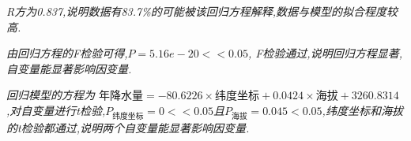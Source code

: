 \documentclass[
]{article}
\begin{document}
\emph{R方为0.837,说明数据有83.7\%的可能被该回归方程解释,数据与模型的拟合程度较高.}

\emph{由回归方程的F检验可得,\(P = 5.16e-20 << 0.05\),
F检验通过,说明回归方程显著,自变量能显著影响因变量.}

\emph{回归模型的方程为
\(\text{年降水量} = -80.6226 \times \text{纬度坐标} + 0.0424 \times \text{海拔} + 3260.8314\)
,对自变量进行t检验,\(P_{\text{纬度坐标}} = 0 << 0.05\)且\(P_{\text{海拔}} = 0.045 < 0.05\),纬度坐标和海拔的t检验都通过,说明两个自变量能显著影响因变量.}
\end{document}

